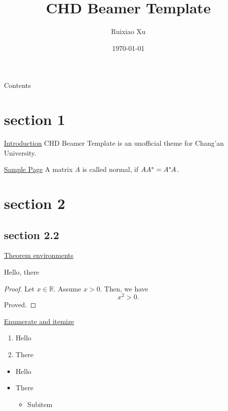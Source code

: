 \documentclass{ctexbeamer}
\title{CHD Beamer Template}
\author{Ruixiao Xu}
\institute{School of Information Engineering\\Chang'an University}
\date{\today}
\begin{document}
\begin{frame}
  \maketitle
\end{frame}

\begin{frame}{Contents}
  \tableofcontents
\end{frame}

\section{section 1}
\begin{frame}{\underline{Introduction}}
  \alert{CHD Beamer Template} is an unofficial theme for Chang'an University.
\end{frame}

\begin{frame}{\underline{Sample Page}}
  A matrix $A$ is called normal, if $AA^*=A^*\mskip-2muA$.
\end{frame}

\section{section 2}
\subsection{section 2.2}
\begin{frame}{\underline{Theorem environments}}
  \begin{theorem}
    Hello, there
  \end{theorem}
  \begin{proof}
    Let $x \in \mathbb{R}$. Assume $x > 0$. Then, we have
    \begin{equation}
      x^2 > 0.
    \end{equation}
    Proved.
  \end{proof}
\end{frame}

\begin{frame}{\underline{Enumerate and itemize}}
  \begin{enumerate}
    \item Hello
    \item There
  \end{enumerate}
  \begin{itemize}
    \item Hello
    \item There
          \begin{itemize}
            \item Subitem
          \end{itemize}
  \end{itemize}
\end{frame}
\end{document}
